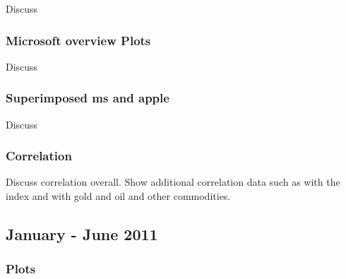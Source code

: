 \documentclass[paper=a4, fontsize=11pt]{scrartcl} %
\numberwithin{equation}{section} %
\numberwithin{figure}{section} %
\numberwithin{table}{section} %
\begin{document}
Discuss

\subsubsection {Microsoft overview Plots}

Discuss

\subsubsection{Superimposed ms and apple}
Discuss

\subsubsection{Correlation}
Discuss correlation overall. Show additional correlation data  such as with the index and with gold and oil and other commodities. 


\subsection{January - June  2011 }
\subsubsection{Plots}
\end{document}
